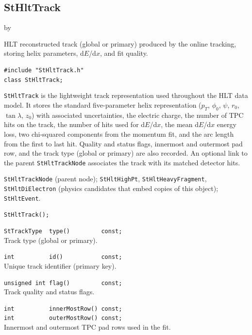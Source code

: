 \documentclass[twoside]{article}
\newcommand{\entrylabel}[1]{\mbox{\textbf{{#1}}}\hfil}%
\newenvironment{entry}
{\begin{list}{}%
    {\renewcommand{\makelabel}{\entrylabel}%
     \setlength{\labelwidth}{90pt}%
     \setlength{\leftmargin}{\labelwidth}
     \advance\leftmargin by \labelsep%
      }%
    }%
  {\end{list}}
\newcommand{\Entrylabel}[1]%
{\raisebox{0pt}[1ex][0pt]{\makebox[\labelwidth][l]%
    {\parbox[t]{\labelwidth}{\hspace{0pt}\textbf{{#1}}}}}}
\newenvironment{Entry}%
{\renewcommand{\entrylabel}{\Entrylabel}\begin{entry}}%
  {\end{entry}}
\begin{document}
\subsection{StHltTrack}
\label{sec:StHltTrack}
\begin{Entry}
\item[Summary] HLT reconstructed track (global or primary) produced by
    the online tracking, storing helix parameters, d$E$/d$x$, and fit
    quality.
\item[Synopsis]
    \verb+#include "StHltTrack.h"+\\
    \verb+class StHltTrack;+\\
\item[Description]
    \texttt{StHltTrack} is the lightweight track representation used
    throughout the HLT data model.  It stores the standard
    five-parameter helix representation ($p_T$, $\phi_0$, $\psi$,
    $r_0$, $\tan\lambda$, $z_0$) with associated uncertainties, the
    electric charge, the number of TPC hits on the track, the number of
    hits used for d$E$/d$x$, the mean d$E$/d$x$ energy loss, two
    chi-squared components from the momentum fit, and the arc length
    from the first to last hit.  Quality and status flags, innermost
    and outermost pad row, and the track type (global or primary) are
    also recorded.  An optional link to the parent
    \texttt{StHltTrackNode} associates the track with its matched
    detector hits.
\item[Related Classes]
    \texttt{StHltTrackNode} (parent node);
    \texttt{StHltHighPt}, \texttt{StHltHeavyFragment},
    \texttt{StHltDiElectron} (physics candidates that embed copies of
    this object); \texttt{StHltEvent}.
\item[Public\\ Constructors]
    \verb+StHltTrack();+\\
\item[Public Member\\ Functions]
    \verb+StTrackType  type()         const;+\\
    Track type (global or primary).

    \verb+int          id()           const;+\\
    Unique track identifier (primary key).

    \verb+unsigned int flag()         const;+\\
    Track quality and status flags.

    \verb+int          innerMostRow() const;+\\
    \verb+int          outerMostRow() const;+\\
    Innermost and outermost TPC pad rows used in the fit.


\end{Entry}
\end{document}
